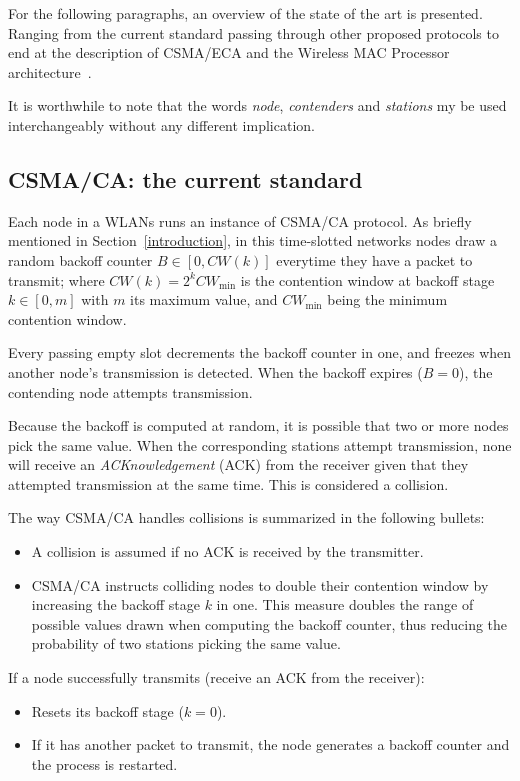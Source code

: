 For the following paragraphs, an overview of the state of the art is presented. Ranging from the current standard passing through other proposed protocols to end at the description of CSMA/ECA and the Wireless MAC Processor architecture~\cite{WMP}.

It is worthwhile to note that the words \emph{node}, \emph{contenders} and \emph{stations} my be used interchangeably without any different implication.

\subsection{CSMA/CA: the current standard}
Each node in a WLANs runs an instance of CSMA/CA protocol. As briefly mentioned in Section~\ref{introduction}, in this time-slotted networks nodes draw a random backoff counter $B\in[0,CW(k)]$ everytime they have a packet to transmit; where $CW(k)=2^{k}CW_{\min}$ is the contention window at backoff stage $k\in[0,m]$ with $m$ its maximum value, and $CW_{\min}$ being the minimum contention window.

Every passing empty slot decrements the backoff counter in one, and freezes when another node's transmission is detected. When the backoff expires ($B=0$), the contending node attempts transmission.

Because the backoff is computed at random, it is possible that two or more nodes pick the same value. When the corresponding stations attempt transmission, none will receive an \emph{ACKnowledgement} (ACK) from the receiver given that they attempted transmission at the same time. This is considered a collision.

The way CSMA/CA handles collisions is summarized in the following bullets:
\begin{itemize}
	\item A collision is assumed if no ACK is received by the transmitter.
	\item CSMA/CA instructs colliding nodes to double their contention window by increasing the backoff stage $k$ in one. This measure doubles the range of possible values drawn when computing the backoff counter, thus reducing the probability of two stations picking the same value.
\end{itemize}

If a node successfully transmits (receive an ACK from the receiver):
\begin{itemize}
	\item Resets its backoff stage ($k=0$).
	\item If it has another packet to transmit, the node generates a backoff counter and the process is restarted.
\end{itemize}

